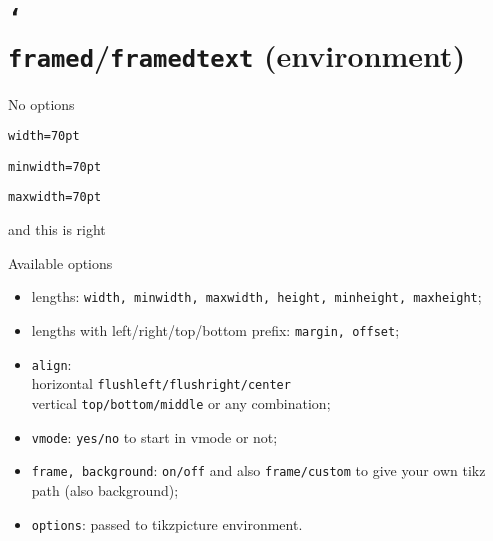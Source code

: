 \documentclass{article}
\let\type\texttt
\def\macro#1{\texttt{\char`\\#1}}
\begin{document}
\clearpage
\section{\macro{framed}/\type{framedtext} (environment)}

\makeatletter

No options\par
{}

\texttt{width=70pt}\par
{}

\texttt{minwidth=70pt}\par
{}

\texttt{maxwidth=70pt}\par
{}

\blank[2*line]
\newcommand\crossout[1][]{%
  \framed[%
    offset=0pt, frame=off, background=on,
    background/custom={
      \begin{pgfonlayer}{foreground}
        \path [draw=red, line cap=round, very thick, #1]
          (0,0) -- (\framedboxwd,-\framedboxht)
          (0,-\framedboxht) -- (\framedboxwd,0);
      \end{pgfonlayer}}]}

\leavevmode
{} and this is right

\blank[line]
\crossout[line width=20pt]{\blindtext}

\blank[2*line]
Available options\par
\begin{itemize}
\item lengths: %
  \texttt{width, minwidth, maxwidth, height, minheight, maxheight};
\item lengths with left/right/top/bottom prefix: %
  \texttt{margin, offset};
\item \texttt{align}:\\
  horizontal \texttt{flushleft/flushright/center}\\
  vertical \texttt{top/bottom/middle} or any combination;
\item \texttt{vmode}: \texttt{yes/no} to start in vmode or not;
\item \texttt{frame, background}: \texttt{on/off} and also
  \texttt{frame/custom} to give your own tikz path (also background);
\item \texttt{options}: passed to tikzpicture environment.
\end{itemize}
\end{document}
